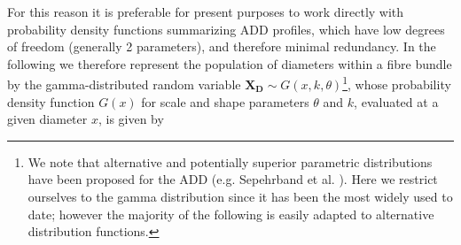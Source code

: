 For this reason it is preferable for present purposes to work directly with probability density functions summarizing ADD profiles, which have low degrees of freedom (generally 2 parameters), and therefore minimal redundancy. In the following we therefore represent the population of diameters within a fibre bundle by the gamma-distributed random variable $\mathbf{X_D} \sim G(x,k,\theta)$\footnote{We note that alternative and potentially superior parametric distributions have been proposed for the ADD (e.g. Sepehrband et al. \cite{sepehrband2016parametric}). Here we restrict ourselves to the gamma distribution since it has been the most widely used to date; however the majority of the following is easily adapted to alternative distribution functions.}, whose probability density function $G(x)$ for scale and shape parameters $\theta$ and $k$, evaluated at a given diameter $x$, is given by 